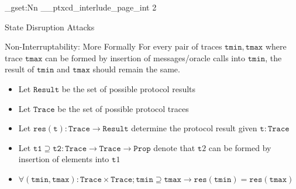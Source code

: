 \ExplSyntaxOn
\int_gset:Nn \g__ptxcd_interlude_page_int {2}
\ExplSyntaxOff


\begin{frame}{State Disruption Attacks}
\end{frame}

\begin{frame}{Non-Interruptability: More Formally}
    For every pair of traces $\mathtt{tmin}, \mathtt{tmax}$ where trace $\mathtt{tmax}$ can be formed by
    insertion of messages/oracle calls into $\mathtt{tmin}$, the result of $\mathtt{tmin}$ and $\mathtt{tmax}$
    should remain the same.

    \begin{itemize}
      \item Let $\mathtt{Result}$ be the set of possible protocol results
      \item Let $\mathtt{Trace}$ be the set of possible protocol traces
      \item Let $\mathtt{res}(\mathtt{t}) : \mathtt{Trace} \to \mathtt{Result}$ determine the protocol result given $\mathtt{t} : \mathtt{Trace}$
      \item Let $\mathtt{t1} \supseteq \mathtt{t2} : \mathtt{Trace} \to \mathtt{Trace} \to \mathtt{Prop}$ denote that $\mathtt{t}2$ can be formed by insertion of elements into $\mathtt{t}1$
      \item $\forall (\mathtt{tmin}, \mathtt{tmax}) : \mathtt{Trace} \times \mathtt{Trace}; \mathtt{tmin} \supseteq \mathtt{tmax} \to \mathtt{res}(\mathtt{tmin}) = \mathtt{res}(\mathtt{tmax})$
    \end{itemize}
\end{frame}

